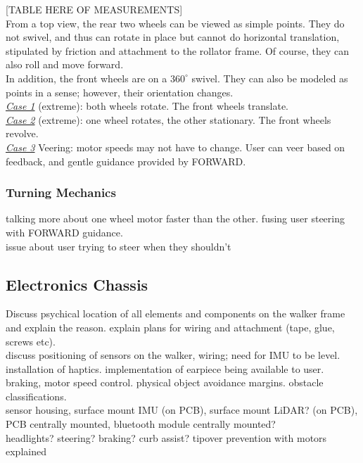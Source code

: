 [TABLE HERE OF MEASUREMENTS]\\

\noindent From a top view, the rear two wheels can be viewed as simple points. They do not swivel, and thus can rotate in place but cannot do horizontal translation, stipulated by friction and attachment to the rollator frame. Of course, they can also roll and move forward.\\

\noindent In addition, the front wheels are on a $360^{\circ}$ swivel. They can also be modeled as points in a sense; however, their orientation changes.\\

\noindent \underline{\textit{Case 1}} (extreme): both wheels rotate. The front wheels translate.\\

\noindent \underline{\textit{Case 2}} (extreme): one wheel rotates, the other stationary. The front wheels revolve.\\

\noindent \underline{\textit{Case 3}} Veering: motor speeds may not have to change. User can veer based on feedback, and gentle guidance provided by FORWARD.\\

\subsubsection{Turning Mechanics}
\noindent talking more about one wheel motor faster than the other. fusing user steering with FORWARD guidance.\\

\noindent issue about user trying to steer when they shouldn't\\

\subsection{Electronics Chassis}
\noindent Discuss psychical location of all elements and components on the walker frame and explain the reason. explain plans for wiring and attachment (tape, glue, screws etc).\\

\noindent discuss positioning of sensors on the walker, wiring; need for IMU to be level. installation of haptics. implementation of earpiece being available to user. braking, motor speed control. physical object avoidance margins. obstacle classifications.\\

\noindent sensor housing, surface mount IMU (on PCB), surface mount LiDAR? (on PCB), PCB centrally mounted, bluetooth module centrally mounted?\\

\noindent headlights? steering? braking? curb assist? tipover prevention with motors explained\\